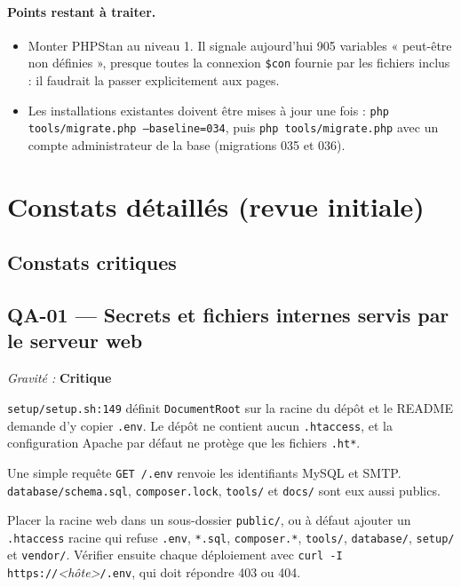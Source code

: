 \documentclass[11pt,a4paper]{article}
\newcommand{\crit}{\textcolor{crit}{\textbf{Critique}}}
\newcommand{\f}[1]{\nolinkurl{#1}}
\newenvironment{constat}[3]{%
  \subsection*{#1 --- #2}\noindent\textit{Gravité :} #3\par\smallskip
  \begin{description}[leftmargin=2.6cm,style=nextline,itemsep=2pt]}{\end{description}}
\begin{document}
\paragraph{Points restant à traiter.}
\begin{itemize}[nosep]
  \item Monter PHPStan au niveau 1. Il signale aujourd'hui 905 variables
    « peut-être non définies », presque toutes la connexion \f{$con} fournie
    par les fichiers inclus : il faudrait la passer explicitement aux pages.
  \item Les installations existantes doivent être mises à jour une fois :
    \texttt{php tools/migrate.php --baseline=034}, puis
    \texttt{php tools/migrate.php} avec un compte administrateur de la base
    (migrations 035 et 036).
\end{itemize}

\section{Constats détaillés (revue initiale)}

\subsection{Constats critiques}

\begin{constat}{QA-01}{Secrets et fichiers internes servis par le serveur web}{\crit}
\item[Preuve] \f{setup/setup.sh:149} définit \f{DocumentRoot} sur la racine du
  dépôt et le README demande d'y copier \f{.env}. Le dépôt ne contient aucun
  \f{.htaccess}, et la configuration Apache par défaut ne protège que les
  fichiers \f{.ht*}.
\item[Risque] Une simple requête \texttt{GET /.env} renvoie les identifiants MySQL et
  SMTP. \f{database/schema.sql}, \f{composer.lock}, \f{tools/} et \f{docs/} sont
  eux aussi publics.
\item[Action] Placer la racine web dans un sous-dossier \f{public/}, ou à défaut
  ajouter un \f{.htaccess} racine qui refuse \f{.env}, \f{*.sql}, \f{composer.*},
  \f{tools/}, \f{database/}, \f{setup/} et \f{vendor/}. Vérifier ensuite chaque
  déploiement avec \texttt{curl -I https://}\textit{<hôte>}\texttt{/.env}, qui doit répondre 403 ou 404.
\end{constat}
\end{document}
